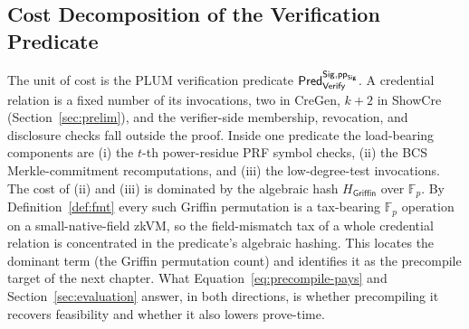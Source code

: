 \subsection{Cost Decomposition of the Verification Predicate}\label{ssec:cost-decomposition}
The unit of cost is the PLUM verification predicate $\mathsf{Pred}_{\mathsf{Verify}}^{\mathsf{Sig},\mathsf{pp}_{\mathsf{Sig}}}$. A credential relation is a fixed number of its invocations, two in CreGen, $k+2$ in ShowCre (Section~\ref{sec:prelim}), and the verifier-side membership, revocation, and disclosure checks fall outside the proof. Inside one predicate the load-bearing components are (i) the $t$-th power-residue PRF symbol checks, (ii) the BCS Merkle-commitment recomputations, and (iii) the low-degree-test invocations. The cost of (ii) and (iii) is dominated by the algebraic hash $H_{\mathsf{Griffin}}$ over $\mathbb{F}_p$. By Definition~\ref{def:fmt} every such Griffin permutation is a tax-bearing $\mathbb{F}_p$ operation on a small-native-field zkVM, so the field-mismatch tax of a whole credential relation is concentrated in the predicate's algebraic hashing. This locates the dominant term (the Griffin permutation count) and identifies it as the precompile target of the next chapter. What Equation~\eqref{eq:precompile-pays} and Section~\ref{sec:evaluation} answer, in both directions, is whether precompiling it recovers feasibility and whether it also lowers prove-time.
